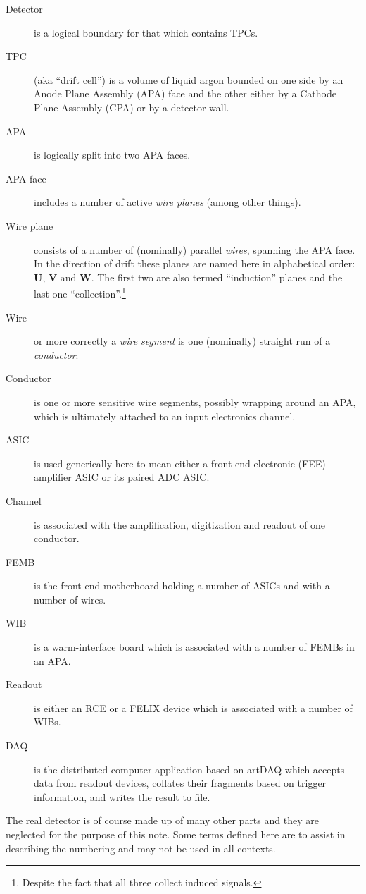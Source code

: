 \documentclass[pdftex,12pt,letter]{article}
\begin{document}
\begin{description}
\item[Detector] is a logical boundary for that which contains TPCs.
\item[TPC] (aka ``drift cell'') is a volume of liquid argon bounded on one side by an Anode
  Plane Assembly (APA) face and the other either by a Cathode Plane
  Assembly (CPA) or by a detector wall.
\item[APA] is logically split into two APA faces.
\item[APA face] includes a number of active \textit{wire
    planes} (among other things).
\item[Wire plane] consists of a number of (nominally) parallel
  \textit{wires}, spanning the APA face.  In the direction of drift
  these planes are named here in alphabetical order: \textbf{U},
  \textbf{V} and \textbf{W}.  The first two are also termed
  ``induction'' planes and the last one
  ``collection''.\footnote{Despite the fact that all three collect
    induced signals.}
\item[Wire] or more correctly a
  \textit{wire segment} is one (nominally) straight run of a \textit{conductor}.
\item[Conductor] is one or more sensitive wire segments, possibly
  wrapping around an APA, which is ultimately attached to an input
  electronics channel.
\item[ASIC] is used generically here to mean either a front-end
  electronic (FEE) amplifier ASIC or its paired ADC ASIC.
\item[Channel] is associated with the amplification, digitization and
  readout of one conductor.
\item[FEMB] is the front-end motherboard holding a number of ASICs and
  with a number of wires.
\item[WIB] is a warm-interface board which is associated with a
  number of FEMBs in an APA.
\item[Readout] is either an RCE or a FELIX device which is associated
  with a number of WIBs.
\item[DAQ] is the distributed computer application based on artDAQ
  which accepts data from readout devices, collates their fragments
  based on trigger information, and writes the result to file.
\end{description}

\noindent The real detector is of course made up of many other parts
and they are neglected for the purpose of this note.  Some terms
defined here are to assist in describing the numbering and may not be
used in all contexts.
\end{document}
